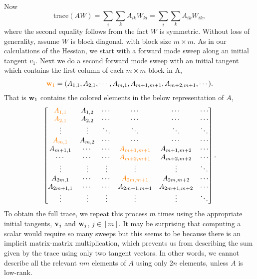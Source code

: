 \documentclass[stslayout, noinfoline]{imsart}
\theoremstyle{definition}
\begin{document}
Now
\begin{equation}
  \text{trace}(AW) = \sum_i \sum_k A_{ik} W_{ki} = \sum_i \sum_k A_{ik} W_{ik},
\end{equation}
%
where the second equality follows from the fact $W$ is symmetric.
Without loss of generality, assume $W$ is block diagonal, with block size $m \times m$.
As in our calculations of the Hessian, we start with a forward mode sweep along an initial tangent $v_1$. 
Next we do a second forward mode sweep with an initial tangent which contains the first column of each $m \times m$ block in A,
%
\begin{equation}  \label{eq:init-tangents-w}
  {\color{orange} {\bf w}_1} = (A_{1,1}, A_{2,1}, \cdots, A_{m, 1}, A_{m + 1, m + 1}, A_{m + 2, m + 1}, \cdots).
\end{equation}
%
That is ${\bf w}_1$ contains the colored elements in the below representation of $A$,
\begin{equation*}
  \begin{bmatrix}
  {\color{orange} A_{1, 1}} & A_{1, 2} & \cdots & \cdots & \cdots & \cdots  \\
  {\color{orange} A_{2, 1}} & A_{2, 2} & \cdots & \cdots & \cdots & \cdots \\
  \vdots & \vdots & \ddots & \ddots & \ddots & \ddots  \\
  {\color{orange} A_{m, 1}} & A_{m, 2} & \cdots & \cdots & \cdots & \cdots \\
  A_{m + 1, 1} & \cdots & \cdots & \color{orange} A_{m + 1, m + 1} & A_{m + 1, m + 2} & \cdots \\
  \cdots & \cdots & \cdots & \color{orange} A_{m + 2, m + 1} & A_{m + 2, m + 2} & \cdots \\
  \vdots & \vdots & \vdots & \vdots & \vdots & \ddots \\
  A_{2m, 1} & \cdots & \cdots & \color{orange} A_{2m, m + 1} & A_{2m, m + 2} & \cdots \\
  A_{2m + 1, 1} & \cdots & \cdots & A_{2m + 1, m + 1} & A_{2m + 1, m + 2} & \cdots \\
  \vdots & \vdots & \vdots & \vdots  & \vdots & \ddots
  \end{bmatrix}.
\end{equation*}
%
To obtain the full trace, we repeat this process $m$ times using the appropriate initial tangents, ${\bf v}_j$ and ${\bf w}_j$, $j \in [m]$.
It may be surprising that computing a scalar would require so many sweeps but this seems to be because there is an implicit matrix-matrix multiplication, which prevents us from describing the sum given by the trace using only two tangent vectors.
In other words, we cannot describe all the relevant $nm$ elements of $A$ using only $2n$ elements,
unless $A$ is low-rank.
\end{document}
